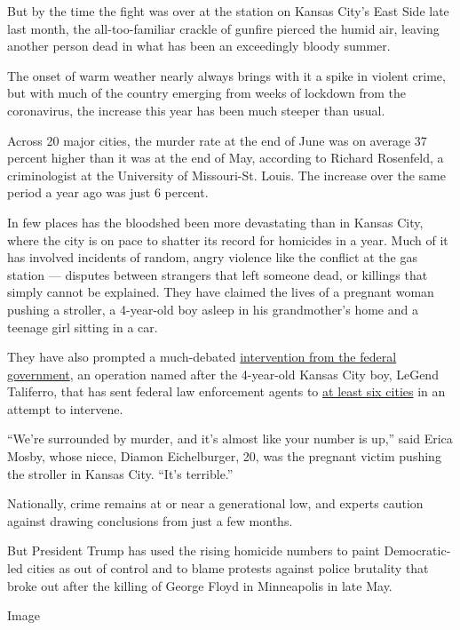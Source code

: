 But by the time the fight was over at the station on Kansas City's East
Side late last month, the all-too-familiar crackle of gunfire pierced
the humid air, leaving another person dead in what has been an
exceedingly bloody summer.

The onset of warm weather nearly always brings with it a spike in
violent crime, but with much of the country emerging from weeks of
lockdown from the coronavirus, the increase this year has been much
steeper than usual.

Across 20 major cities, the murder rate at the end of June was on
average 37 percent higher than it was at the end of May, according to
Richard Rosenfeld, a criminologist at the University of Missouri-St.
Louis. The increase over the same period a year ago was just 6 percent.

In few places has the bloodshed been more devastating than in Kansas
City, where the city is on pace to shatter its record for homicides in a
year. Much of it has involved incidents of random, angry violence like
the conflict at the gas station --- disputes between strangers that left
someone dead, or killings that simply cannot be explained. They have
claimed the lives of a pregnant woman pushing a stroller, a 4-year-old
boy asleep in his grandmother's home and a teenage girl sitting in a
car.

They have also prompted a much-debated
\href{https://www.justice.gov/opa/pr/attorney-general-william-p-barr-announces-launch-operation-legend}{intervention
from the federal government}, an operation named after the 4-year-old
Kansas City boy, LeGend Taliferro, that has sent federal law enforcement
agents to
\href{https://www.justice.gov/opa/pr/operation-legend-expanded-cleveland-detroit-and-milwaukee}{at
least six cities} in an attempt to intervene.

``We're surrounded by murder, and it's almost like your number is up,''
said Erica Mosby, whose niece, Diamon Eichelburger, 20, was the pregnant
victim pushing the stroller in Kansas City. ``It's terrible.''

Nationally, crime remains at or near a generational low, and experts
caution against drawing conclusions from just a few months.

But President Trump has used the rising homicide numbers to paint
Democratic-led cities as out of control and to blame protests against
police brutality that broke out after the killing of George Floyd in
Minneapolis in late May.

Image

